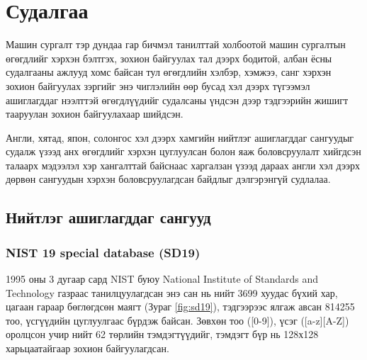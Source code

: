 
\chapter{Судалгаа}

Машин сургалт тэр дундаа гар бичмэл танилттай холбоотой машин сургалтын өгөгдлийг хэрхэн бэлтгэх, зохион байгуулах тал дээрх бодитой, албан ёсны судалгааны ажлууд хомс байсан тул өгөгдлийн хэлбэр, хэмжээ, санг хэрхэн зохион байгуулах зэргийг энэ чиглэлийн өөр бусад хэл дээрх түгээмэл ашиглагддаг нээлттэй өгөгдлүүдийг судалсаны үндсэн дээр тэдгээрийн жишигт тааруулан зохион байгуулахаар шийдсэн.

Англи, хятад, япон, солонгос хэл дээрх хамгийн нийтлэг ашиглагддаг сангуудыг судалж үзээд анх өгөгдлийг хэрхэн цуглуулсан болон яаж боловсруулалт хийгдсэн талаарх мэдээлэл хэр хангалттай байснаас харгалзан үзээд дараах англи хэл дээрх дөрвөн сангуудын хэрхэн боловсруулагдсан байдлыг дэлгэрэнгүй судлалаа.

\section{Нийтлэг ашиглагддаг сангууд}

\subsection{NIST 19 special database (SD19)}

1995 оны 3 дугаар сард NIST буюу National Institute of Standards and Technology газраас танилцуулагдсан энэ сан нь нийт 3699 хуудас бүхий хар, цагаан гараар бөглөгдсөн маягт (Зураг \ref{fig:sd19}), тэдгээрээс ялгаж авсан 814255 тоо, үсгүүдийн цуглуулгаас бүрдэж байсан. Зөвхөн тоо ([0-9]), үсэг ([a-z][A-Z]) оролцсон учир нийт 62 төрлийн тэмдэгтүүдийг, тэмдэгт бүр нь 128х128 харьцаатайгаар зохион байгуулагдсан. \cite{nist19}

